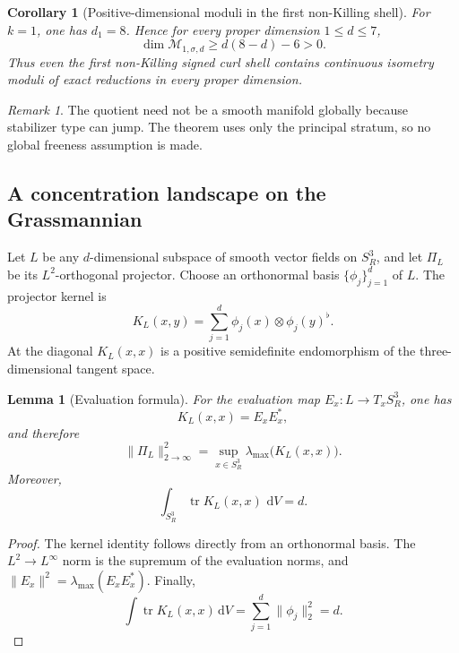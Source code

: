 \documentclass[
 aps,
 prd,
 reprint,
 amsmath,
 amssymb,
 nofootinbib,
 superscriptaddress
]{revtex4-2}
\newtheorem{lemma}[theorem]{Lemma}
\newtheorem{corollary}[theorem]{Corollary}
\theoremstyle{definition}
\theoremstyle{remark}
\newtheorem{remark}[theorem]{Remark}
\newcommand{\Sthree}{S^3_R}
\newcommand{\cM}{\mathscr M}
\newcommand{\dd}{\,\mathrm d}
\newcommand{\tr}{\operatorname{tr}}
\begin{document}
\begin{corollary}[Positive-dimensional moduli in the first non-Killing shell]
\label{G:cor:firstshellmoduli}
For $k=1$, one has $d_1=8$.  Hence for every proper dimension
$1\le d\le7$,
\[
        \dim\cM_{1,\sigma,d}\ge d(8-d)-6>0.
\]
Thus even the first non-Killing signed curl shell contains continuous
isometry moduli of exact reductions in every proper dimension.
\end{corollary}

\begin{remark}
The quotient need not be a smooth manifold globally because stabilizer type
can jump.  The theorem uses only the principal stratum, so no global
freeness assumption is made.
\end{remark}

\subsection{A concentration landscape on the Grassmannian}

Let $L$ be any $d$-dimensional subspace of smooth vector fields on $\Sthree$,
and let $\Pi_L$ be its $L^2$-orthogonal projector.  Choose an orthonormal
basis $\{\phi_j\}_{j=1}^d$ of $L$.  The projector kernel is
\begin{equation}
 K_L(x,y)
 =
 \sum_{j=1}^d
 \phi_j(x)\otimes\phi_j(y)^\flat.
 \label{G:eq:kernel}
\end{equation}
At the diagonal $K_L(x,x)$ is a positive semidefinite endomorphism of the
three-dimensional tangent space.

\begin{lemma}[Evaluation formula]
\label{G:lem:evaluation}
For the evaluation map
$E_x:L\to T_x\Sthree$, one has
\[
 K_L(x,x)=E_xE_x^*,
\]
and therefore
\begin{equation}
 \|\Pi_L\|_{2\to\infty}^2
 =
 \sup_{x\in\Sthree}
 \lambda_{\max}\bigl(K_L(x,x)\bigr).
 \label{G:eq:L2kernel}
\end{equation}
Moreover,
\begin{equation}
 \int_{\Sthree}\tr K_L(x,x)\,\dd V=d.
 \label{G:eq:traceidentity}
\end{equation}
\end{lemma}

\begin{proof}
The kernel identity follows directly from an orthonormal basis.  The
$L^2\to L^\infty$ norm is the supremum of the evaluation norms, and
$\|E_x\|^2=\lambda_{\max}(E_xE_x^*)$.  Finally,
\[
 \int\tr K_L(x,x)\dd V
 =
 \sum_{j=1}^d\|\phi_j\|_2^2=d.
\]
\end{proof}
\end{document}
